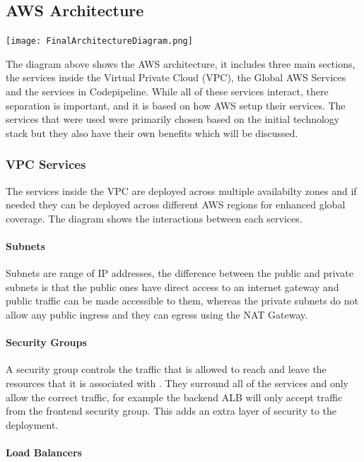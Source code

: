 \documentclass[]{project_report}
\begin{document}
\subsection{AWS Architecture}
\texttt{[image: FinalArchitectureDiagram.png]}

The diagram above shows the AWS architecture, it includes three main sections, the services inside the Virtual Private Cloud (VPC), the Global AWS Services and the services in Codepipeline. While all of these services interact, there separation is important, and it is based on how AWS setup their services. The services that were used were primarily chosen based on the initial technology stack but they also have their own benefits which will be discussed.

\subsubsection{VPC Services}

The services inside the VPC are deployed across multiple availabilty zones and if needed they can be deployed across different AWS regions for enhanced global coverage. The diagram shows the interactions between each services. 

\paragraph{Subnets}

Subnets are range of IP addresses, the difference between the public and private subnets is that the public ones have direct access to an internet gateway and public traffic can be made accessible to them, whereas the private subnets do not allow any public ingress and they can egress using the NAT Gateway.

\paragraph{Security Groups}
A security group controls the traffic that is allowed to reach and leave the resources that it is associated with \cite{aws_sg}. They surround all of the services and only allow the correct traffic, for example the backend ALB will only accept traffic from the frontend security group. This adds an extra layer of security to the deployment. 

\paragraph{Load Balancers}
\end{document}
